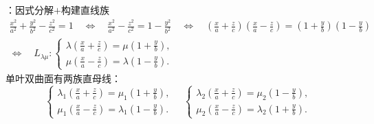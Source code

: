 ：因式分解$+$构建直线族
\begin{equation*}
\begin{aligned}
\displaystyle \frac{x^2}{a^2}+\frac{y^2}{b^2}-\frac{z^2}{c^2}=1
\quad \Longleftrightarrow \quad
\displaystyle \frac{x^2}{a^2}-\frac{z^2}{c^2}=1-\frac{y^2}{b^2}
\quad \Longleftrightarrow \quad
\left(\frac{x}{a}+\frac{z}{c}\right) \left(\frac{x}{a}-\frac{z}{c}\right)= \left(1+\frac{y}{b}\right) \left(1-\frac{y}{b}\right)\\
\Longleftrightarrow \quad
L_{\lambda \mu}:
\begin{cases}
\displaystyle \lambda \left(\frac{x}{a}+\frac{z}{c}\right)=\mu \left(1+\frac{y}{b}\right),\\
\displaystyle \mu \left(\frac{x}{a}-\frac{z}{c}\right)=\lambda \left(1-\frac{y}{b}\right).
\end{cases}
\end{aligned}
\end{equation*}
单叶双曲面有两族直母线：
\begin{equation*}
\begin{cases}
\displaystyle \lambda_1 \left(\frac{x}{a}+\frac{z}{c}\right)=\mu_1 \left(1+\frac{y}{b}\right),\\
\displaystyle \mu_1 \left(\frac{x}{a}-\frac{z}{c}\right)=\lambda_1 \left(1-\frac{y}{b}\right).
\end{cases}
\quad 
\begin{cases}
\displaystyle \lambda_2 \left(\frac{x}{a}+\frac{z}{c}\right)=\mu_2 \left(1-\frac{y}{b}\right),\\
\displaystyle \mu_2 \left(\frac{x}{a}-\frac{z}{c}\right)=\lambda_2 \left(1+\frac{y}{b}\right).
\end{cases}
\end{equation*}

